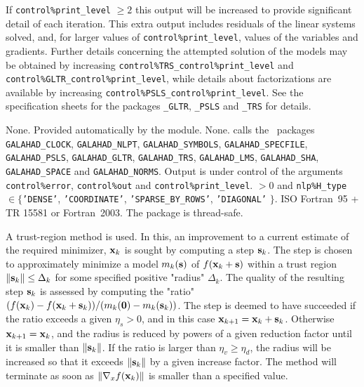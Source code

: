 \documentclass{galahad}
\newcommand{\packagename}{TRU}
\begin{document}
If {\tt control\%print\_level} $\geq 2$ this
output will be increased to provide significant detail of each iteration.
This extra output includes residuals of the linear systems solved, and,
for larger values of {\tt control\%print\_level}, values of the variables
and gradients. Further details concerning the attempted solution of the models
may be obtained by increasing
{\tt control\%TRS\_control\%print\_level}
and
{\tt control\%GLTR\_control\%print\_level},
while details about factorizations are available
by increasing
{\tt control\%PSLS\_control\%print\_level}.
See the specification sheets for the packages
{\tt \libraryname\_GLTR},
{\tt \libraryname\_PSLS} and
{\tt \libraryname\_TRS}
for details.


\galgeneral

\galcommon None.
\galworkspace Provided automatically by the module.
\galroutines None.
\galmodules {\tt \packagename\_solve} calls the \galahad\ packages
{\tt GALAHAD\_CLOCK},
{\tt GALAHAD\_NLPT},
{\tt GALAHAD\_SY\-M\-BOLS}, \sloppy
{\tt GALAHAD\_SPECFILE},
{\tt GALAHAD\_PSLS},
{\tt GALAHAD\_GLTR},
{\tt GALAHAD\_TRS},
{\tt GALAHAD\_LMS},
{\tt GALAHAD\_SHA},
{\tt GALAHAD\_SPACE} and
{\tt GALAHAD\_NORMS}.
\galio Output is under control of the arguments
 {\tt control\%error}, {\tt control\%out} and {\tt control\%print\_level}.
 $> 0$ and
{\tt nlp\%H\_type} $\in \{${\tt 'DENSE'},
 {\tt 'COORDINATE'}, {\tt 'SPARSE\_BY\_ROWS'}, {\tt 'DIAGONAL'} $\}$.
\galportability ISO Fortran~95 + TR 15581 or Fortran~2003.
The package is thread-safe.


\galmethod
A trust-region method is used. In this, an improvement to a current
estimate of the required minimizer, ${\mathbf{x}}_k$ is sought by computing a
step ${\mathbf{s}}_k$. The step is chosen to approximately minimize a model $m_k({\mathbf{s}})$
of $f({\mathbf{x}}_k + {\mathbf{s}})$ within a trust region $\|{\mathbf{s}}_k\| \leq \Delta_k$
for some specified positive "radius" $\Delta_k$. The quality of the
resulting step ${\mathbf{s}}_k$ is assessed by computing the "ratio"
$(f({\mathbf{x}}_k) - f({\mathbf{x}}_k + {\mathbf{s}}_k))/ (m_k({\mathbf{0}}) - m_k({\mathbf{s}}_k))$.
The step is deemed to have succeeded if the ratio exceeds a given $\eta_s > 0$,
and in this case ${\mathbf{x}}_{k+1} = {\mathbf{x}}_k + {\mathbf{s}}_k$. Otherwise
${\mathbf{x}}_{k+1} = {\mathbf{x}}_k$, and the radius is reduced by powers of a given
reduction factor until it is smaller than $\|{\mathbf{s}}_k\|$. If the ratio
is larger than  $\eta_v \geq \eta_d$, the radius will be increased so that
it exceeds $\|{\mathbf{s}}_k\|$ by a given increase factor. The method will terminate
as soon as $\|\nabla_x f({\mathbf{x}}_k)\|$ is smaller than a specified value.
\end{document}
